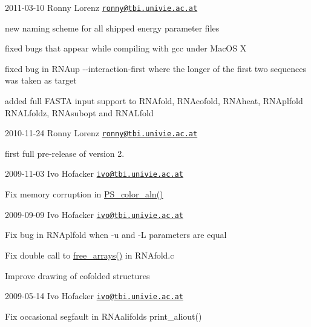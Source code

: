 2011-\/03-\/10 Ronny Lorenz \href{mailto:ronny@tbi.univie.ac.at}{\tt ronny@tbi.\+univie.\+ac.\+at}
\begin{DoxyItemize}
\item new naming scheme for all shipped energy parameter files
\item fixed bugs that appear while compiling with gcc under Mac\+OS X
\item fixed bug in R\+N\+Aup -\/-\/interaction-\/first where the longer of the first two sequences was taken as target
\item added full F\+A\+S\+TA input support to R\+N\+Afold, R\+N\+Acofold, R\+N\+Aheat, R\+N\+Aplfold R\+N\+A\+Lfoldz, R\+N\+Asubopt and R\+N\+A\+Lfold
\end{DoxyItemize}

2010-\/11-\/24 Ronny Lorenz \href{mailto:ronny@tbi.univie.ac.at}{\tt ronny@tbi.\+univie.\+ac.\+at}
\begin{DoxyItemize}
\item first full pre-\/release of version 2.
\end{DoxyItemize}

2009-\/11-\/03 Ivo Hofacker \href{mailto:ivo@tbi.univie.ac.at}{\tt ivo@tbi.\+univie.\+ac.\+at}
\begin{DoxyItemize}
\item Fix memory corruption in \hyperlink{group__plotting__utils_ga821802c3685e37e15182341f6217470d}{P\+S\+\_\+color\+\_\+aln()}
\end{DoxyItemize}

2009-\/09-\/09 Ivo Hofacker \href{mailto:ivo@tbi.univie.ac.at}{\tt ivo@tbi.\+univie.\+ac.\+at}
\begin{DoxyItemize}
\item Fix bug in R\+N\+Aplfold when -\/u and -\/L parameters are equal
\item Fix double call to \hyperlink{group__mfe__fold__single_ga107fdfe5fd641868156bfd849f6866c7}{free\+\_\+arrays()} in R\+N\+Afold.\+c
\item Improve drawing of cofolded structures
\end{DoxyItemize}

2009-\/05-\/14 Ivo Hofacker \href{mailto:ivo@tbi.univie.ac.at}{\tt ivo@tbi.\+univie.\+ac.\+at}


\begin{DoxyItemize}
\item Fix occasional segfault in R\+N\+Aalifold\textquotesingle{}s print\+\_\+aliout()
\end{DoxyItemize}

